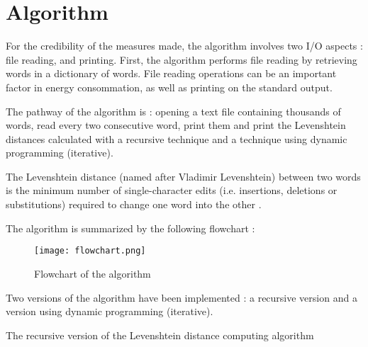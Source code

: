 \section{Algorithm}
\label{sec:Algorithm}

	For the credibility of the measures made, the algorithm involves two I/O aspects : file reading, and printing. First, the algorithm performs file reading by retrieving words in a dictionary of words. File reading operations can be an important factor in energy consommation, as well as printing on the standard output.
	
	The pathway of the algorithm is : opening a text file containing thousands of words, read every two consecutive word, print them and print the Levenshtein distances calculated with a recursive technique and a technique using dynamic programming (iterative).
	
	The Levenshtein distance (named after Vladimir Levenshtein) between two words is the minimum number of single-character edits (i.e. insertions, deletions or substitutions) required to change one word into the other \cite{levenshtein-distance}. 

The algorithm is summarized by the following flowchart :
\begin{figure}[H]
\centering
\texttt{[image: flowchart.png]}
\caption{Flowchart of the algorithm}
\label{fig:flowchart}
\end{figure}

Two versions of the algorithm have been implemented : a recursive version and a version using dynamic programming (iterative).

\bigskip
{}
\begin{algorithm}[H]
\caption{The recursive version of the Levenshtein distance computing algorithm}
\end{algorithm}

